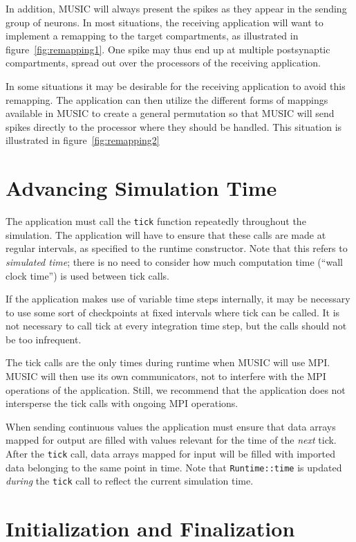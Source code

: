 \documentclass[a4paper,twoside]{report}
\begin{document}
In addition, MUSIC will always present the spikes as they appear in
the sending group of neurons.  In most situations, the receiving
application will want to implement a remapping to the target
compartments, as illustrated in figure~\ref{fig:remapping1}.  One spike
may thus end up at multiple postsynaptic compartments, spread out over
the processors of the receiving application.

In some situations it may be desirable for the receiving application
to avoid this remapping.  The application can then utilize the different
forms of mappings available in MUSIC to create a general permutation
so that MUSIC will send spikes directly to the processor where they
should be handled.  This situation is illustrated in
figure~\ref{fig:remapping2}


\section{Advancing Simulation Time}

The application must call the \lstinline|tick| function repeatedly
throughout the simulation.  The application will have to ensure that
these calls are made at regular intervals, as specified to the runtime
constructor.  Note that this refers to \emph{simulated time}; there is
no need to consider how much computation time (``wall clock time'') is
used between tick calls.

If the application makes use of variable time steps internally, it may
be necessary to use some sort of checkpoints at fixed intervals where
tick can be called.  It is not necessary to call tick at every
integration time step, but the calls should not be too infrequent.

The tick calls are the only times during runtime when MUSIC will use
MPI.  MUSIC will then use its own communicators, not to interfere with
the MPI operations of the application.  Still, we recommend that the
application does not intersperse the tick calls with ongoing MPI
operations.

When sending continuous values the application must ensure that data
arrays mapped for output are filled with values relevant for the time
of the \emph{next} tick.  After the \lstinline|tick| call, data arrays
mapped for input will be filled with imported data belonging to the
same point in time.  Note that \lstinline|Runtime::time| is updated
\emph{during} the \lstinline|tick| call to reflect the current
simulation time.


\section{Initialization and Finalization}
\end{document}
